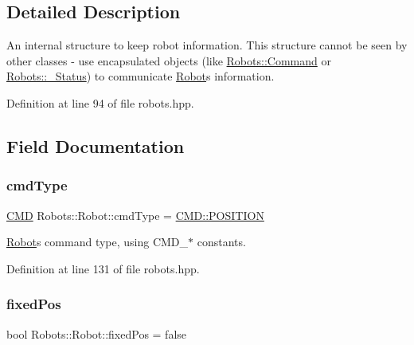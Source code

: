 \subsection{Detailed Description}
An internal structure to keep robot information. This structure cannot be seen by other classes -\/ use encapsulated objects (like \hyperlink{struct_robots_1_1_command}{Robots\+::\+Command} or \hyperlink{struct_robots_1_1___status}{Robots\+::\+\_\+\+Status}) to communicate \hyperlink{struct_robots_1_1_robot}{Robot}\textquotesingle{}s information. 

Definition at line 94 of file robots.\+hpp.



\subsection{Field Documentation}
\mbox{\label{struct_robots_1_1_robot_a3b0d74c67bc694279130a2f280d7096a}} 
\subsubsection{\texorpdfstring{cmd\+Type}{cmdType}}
{\footnotesize\ttfamily \hyperlink{class_robots_adcc7ae7fbb9bdc57a26ee70fa1ae88e5}{C\+MD} Robots\+::\+Robot\+::cmd\+Type = \hyperlink{serial_w_8hpp_a440f0e10bb28b153f5661c934bc6b89f}{C\+M\+D\+::\+P\+O\+S\+I\+T\+I\+ON}}



\hyperlink{struct_robots_1_1_robot}{Robot}\textquotesingle{}s command type, using C\+M\+D\+\_\+$\ast$ constants. 



Definition at line 131 of file robots.\+hpp.

\mbox{\label{struct_robots_1_1_robot_afebd5333f53eb0da7da943b43ebfde3a}} 
\subsubsection{\texorpdfstring{fixed\+Pos}{fixedPos}}
{\footnotesize\ttfamily bool Robots\+::\+Robot\+::fixed\+Pos = false}



